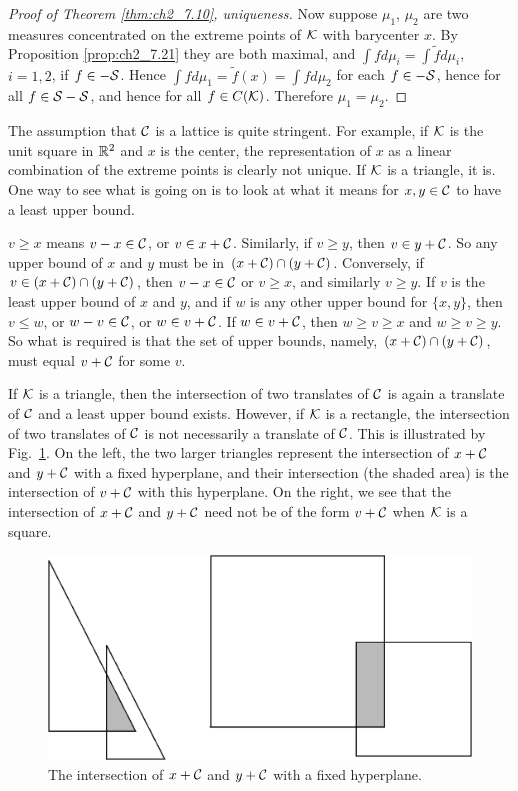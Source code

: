 \begin{proof}[Proof of Theorem \ref{thm:ch2_7.10}, uniqueness]
Now suppose $\mu_1$, $\mu_2$ are two measures concentrated on the extreme points of $\mathcal{K}$ with barycenter $x$. By Proposition \ref{prop:ch2_7.21} they are both maximal, and $\int fd\mu_i = \int \widetilde{f}d\mu_i$, $i = 1,2$, if $f \in -\mathcal{S}$. Hence $\int fd\mu_1 = \widetilde{f}(x) = \int fd\mu_2$ for each $f \in -\mathcal{S}$, hence for all $f \in \mathcal{S} - \mathcal{S}$, and hence for all $f \in C(\mathcal{K})$. Therefore $\mu_1 = \mu_2$.
\end{proof}


The assumption that $\mathcal{C}$ is a lattice is quite stringent. For example, if $\mathcal{K}$ is the unit square in $\mathbb{R}^2$ and $x$ is the center, the representation of $x$ as a linear combination of the extreme points is clearly not unique. If $\mathcal{K}$ is a triangle, it is. One way to see what is going on is to look at what it means for $x,y \in \mathcal{C}$ to have a least upper bound.

$v \geq x$ means $v-x \in \mathcal{C}$, or $v \in x+\mathcal{C}$. Similarly, if $v \geq y$, then $v \in y+\mathcal{C}$. So any upper bound of $x$ and $y$ must be in $(x+\mathcal{C}) \cap (y+\mathcal{C})$. Conversely, if $v \in (x+\mathcal{C})\cap(y+\mathcal{C})$, then $v-x \in \mathcal{C}$ or $v \geq x$, and similarly $v \geq y$. If $v$ is the least upper bound of $x$ and $y$, and if $w$ is any other upper bound for $\{x,y\}$, then $v \leq w$, or $w-v \in \mathcal{C}$, or $w \in v+\mathcal{C}$. If $w \in v+\mathcal{C}$, then $w \geq v \geq x$ and $w \geq v \geq y$. So what is required is that the set of upper bounds, namely, $(x+\mathcal{C}) \cap (y+\mathcal{C})$, must equal $v+\mathcal{C}$ for some $v$.

If $\mathcal{K}$ is a triangle, then the intersection of two translates of $\mathcal{C}$ is again a translate of $\mathcal{C}$ and a least upper bound exists. However, if $\mathcal{K}$ is a rectangle, the intersection of two translates of $\mathcal{C}$ is not necessarily a translate of $\mathcal{C}$. This is illustrated by Fig.\ \ref{fig:ch2_7.1}. On the left, the two larger triangles represent the intersection of $x+\mathcal{C}$ and $y+\mathcal{C}$ with a fixed hyperplane, and their intersection (the shaded area) is the intersection of $v+\mathcal{C}$ with this hyperplane. On the right, we see that the intersection of $x+\mathcal{C}$ and $y+\mathcal{C}$ need not be of the form $v+\mathcal{C}$ when $\mathcal{K}$ is a square.

\bigskip
\begin{figure}[ht]
    \hspace{-15mm}\centering\includegraphics{Images/Img4.png}
    \caption{The intersection of $x+\mathcal{C}$ and $y+\mathcal{C}$ with a fixed hyperplane.}
    \label{fig:ch2_7.1}
\end{figure}

